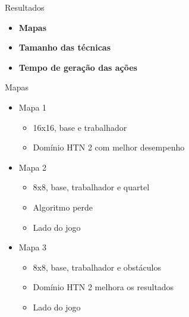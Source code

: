 \documentclass{beamer}
\begin{document}
{
	\begin{frame}{Resultados}
		\vspace{5mm}
		\begin{itemize}
			\item \textbf{Mapas}
			\item \textbf{Tamanho das técnicas}
			\item \textbf{Tempo de geração das ações}
		\end{itemize}
	\end{frame}
}
\begin{frame}{Mapas}
	\begin{itemize}
		\item Mapa 1
		\begin{itemize}
			\item 16x16, base e trabalhador
			\item Domínio HTN 2 com melhor desempenho
		\end{itemize}
		\item Mapa 2
		\begin{itemize}
			\item 8x8, base, trabalhador e quartel
			\item Algoritmo perde
			\item Lado do jogo
		\end{itemize}
		\item Mapa 3
		\begin{itemize}
			\item 8x8, base, trabalhador e obstáculos
			\item Domínio HTN 2 melhora os resultados
			\item Lado do jogo
		\end{itemize}
	\end{itemize}
	

\end{frame}
\end{document}

